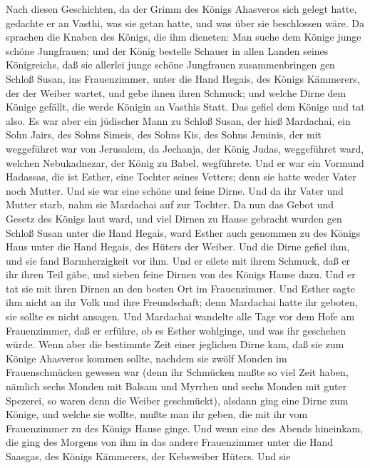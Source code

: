  Nach diesen Geschichten, da der Grimm des Königs Ahasveros
sich gelegt hatte, gedachte er an Vasthi, was sie getan hatte, und was
über sie beschlossen wäre.  Da sprachen die Knaben des
Königs, die ihm dieneten: Man suche dem Könige junge schöne Jungfrauen;
 und der König bestelle Schauer in allen Landen seines
Königreichs, daß sie allerlei junge schöne Jungfrauen zusammenbringen
gen Schloß Susan, ins Frauenzimmer, unter die Hand Hegais, des Königs
Kämmerers, der der Weiber wartet, und gebe ihnen ihren Schmuck;
 und welche Dirne dem Könige gefällt, die werde Königin an
Vasthis Statt. Das gefiel dem Könige und tat also.  Es war
aber ein jüdischer Mann zu Schloß Susan, der hieß Mardachai, ein Sohn
Jairs, des Sohns Simeis, des Sohns Kis, des Sohns Jeminis, 
der mit weggeführet war von Jerusalem, da Jechanja, der König Judas,
weggeführet ward, welchen Nebukadnezar, der König zu Babel, wegführete.
 Und er war ein Vormund Hadassas, die ist Esther, eine
Tochter seines Vetters; denn sie hatte weder Vater noch Mutter. Und sie
war eine schöne und feine Dirne. Und da ihr Vater und Mutter starb, nahm
sie Mardachai auf zur Tochter.  Da nun das Gebot und Gesetz
des Königs laut ward, und viel Dirnen zu Hause gebracht wurden gen
Schloß Susan unter die Hand Hegais, ward Esther auch genommen zu des
Königs Haus unter die Hand Hegais, des Hüters der Weiber. 
Und die Dirne gefiel ihm, und sie fand Barmherzigkeit vor ihm. Und er
eilete mit ihrem Schmuck, daß er ihr ihren Teil gäbe, und sieben feine
Dirnen von des Königs Hause dazu. Und er tat sie mit ihren Dirnen an den
besten Ort im Frauenzimmer.  Und Esther sagte ihm nicht an
ihr Volk und ihre Freundschaft; denn Mardachai hatte ihr geboten, sie
sollte es nicht ansagen.  Und Mardachai wandelte alle Tage
vor dem Hofe am Frauenzimmer, daß er erführe, ob es Esther wohlginge,
und was ihr geschehen würde.  Wenn aber die bestimmte Zeit
einer jeglichen Dirne kam, daß sie zum Könige Ahasveros kommen sollte,
nachdem sie zwölf Monden im Frauenschmücken gewesen war (denn ihr
Schmücken mußte so viel Zeit haben, nämlich sechs Monden mit Balsam und
Myrrhen und sechs Monden mit guter Spezerei, so waren denn die Weiber
geschmückt),  alsdann ging eine Dirne zum Könige, und
welche sie wollte, mußte man ihr geben, die mit ihr vom Frauenzimmer zu
des Königs Hause ginge.  Und wenn eine des Abends
hineinkam, die ging des Morgens von ihm in das andere Frauenzimmer unter
die Hand Saasgas, des Königs Kämmerers, der Kebsweiber Hüters. Und sie

